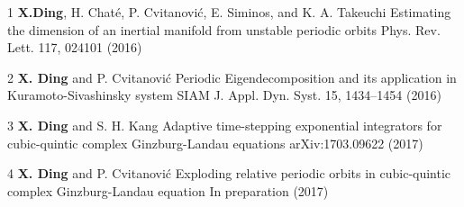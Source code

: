 
\begin{cvpub}

  \cvpubentry
  {1}
  {\textbf{X.Ding},  H. Chat\'e, P. Cvitanovi\'c, E. Siminos, and K. A. Takeuchi}
  {Estimating the dimension of an inertial manifold from unstable periodic orbits}
  {Phys. Rev. Lett. 117, 024101 (2016)}

  \cvpubentry
  {2}
  {\textbf{X. Ding} and P. Cvitanovi\'c}
  {Periodic Eigendecomposition and its application in Kuramoto-Sivashinsky system}
  {SIAM J. Appl. Dyn. Syst. 15, 1434–1454 (2016)}

  \cvpubentry
  {3}
  {\textbf{X. Ding} and S. H. Kang}
  {Adaptive time-stepping exponential integrators for cubic-quintic complex Ginzburg-Landau equations}
  {arXiv:1703.09622 (2017)}

  \cvpubentry
  {4}
  {\textbf{X. Ding} and P. Cvitanovi\'c}
  {Exploding relative periodic orbits in cubic-quintic complex Ginzburg-Landau equation}
  {In preparation (2017)}


\end{cvpub}
